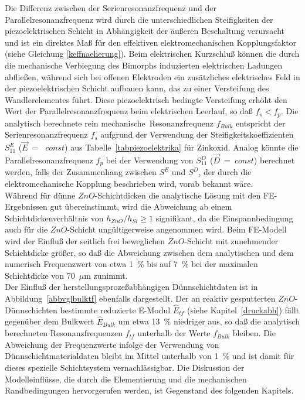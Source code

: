 Die Differenz zwischen der Serienresonanzfrequenz und der
Parallelresonanzfrequenz wird durch die unterschiedlichen Steifigkeiten
der piezoelektrischen Schicht in Abhängigkeit der äußeren Beschaltung
verursacht und ist ein direktes Maß für den effektiven elektromechanischen
Kopplungsfaktor (siehe Gleichung \ref{keffnaeherung}). Beim elektrischen
Kurzschluß können die durch die mechanische Verbiegung des Bimorphs
induzierten elektrischen Ladungen ab\-fließen, während sich bei offenen
Elektroden ein zusätzliches
elektrisches Feld in der piezoelektrischen Schicht aufbauen kann, das zu
einer Versteifung des Wandlerelementes führt. Diese piezoelektrisch
bedingte Versteifung erhöht den Wert der Parallelresonanzfrequenz beim
elektrischen Leerlauf, so daß $f_{s} < f_{p}$.
Die analytisch berechnete \glqq rein mechanische\grqq \, Resonanzfrequenz
$f_{Bulk}$ entspricht der Serienresonanzfrequenz $f_{s}$ aufgrund der
Verwendung der Steifigkeitskoeffizienten $S_{11}^{E}$ ($\vec E$~=~ $const$)
aus Tabelle~\ref{tabpiezoelektrika} für Zinkoxid. Analog könnte die
Parallelresonanzfrequenz $f_{p}$ bei der Verwendung von $S_{11}^{D}$
($\vec D$~=~$const$) berechnet werden, falls der Zusammenhang zwischen
$S^{E}$ und $S^{D}$, der durch die elektromechanische Kopplung
beschrieben wird, vorab bekannt wäre.\\
Während für dünne $ZnO$-Schichtdicken die analytische Lösung mit den
FE-Ergebnissen gut übereinstimmt, wird die Abweichung ab einem
Schichtdickenverhältnis von $h_{ZnO}/h_{Si} \ge 1$ signifikant, da die
Einspannbedingung auch für die $ZnO$-Schicht ungültigerweise angenommen wird.
Beim FE-Modell wird der Einfluß der seitlich frei beweglichen $ZnO$-Schicht
mit zunehmender Schichtdicke größer, so daß die Abweichung zwischen dem
analytischen und dem
numerisch Frequenzwert von etwa 1~\% bis auf 7~\% bei der maximalen
Schichtdicke von 70~$\mu$m zunimmt. \\
%
Der Einfluß der herstellungsprozeßabhängigen Dünnschichtdaten ist
in Abbildung~\ref{abbvglbulktf} ebenfalls dargestellt. Der an reaktiv
gesputterten $ZnO$-Dünnschichten \cite{Wag94} bestimmte reduzierte E-Modul
$\hat E_{tf}$ (siehe Kapitel~\ref{druckabh}) fällt gegenüber dem
Bulkwert $\hat E_{Bulk}$ um etwa 13~\% niedriger aus, so daß die
analytisch berechneten Resonanzfrequenzen $f_{tf}$ unterhalb der
Werte $f_{Bulk}$ bleiben. Die Abweichung der Frequenzwerte infolge
der Verwendung von Dünnschichtmaterialdaten bleibt im Mittel unterhalb
von 1~\% und ist damit für dieses spezielle Schichtsystem vernachlässigbar.
Die Diskussion der Modelleinflüsse, die durch die Elementierung und die
mechanischen Randbedingungen hervorgerufen werden,
ist Gegenstand des folgenden Kapitels.\\



